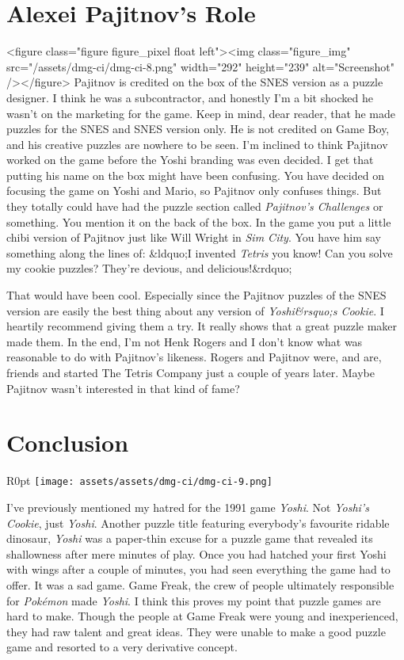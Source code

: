 \documentclass{book}
\begin{document}
\FloatBarrier\needspace{10mm}\section*{Alexei Pajitnov’s Role}\nopagebreak[4]

<figure class="figure figure_pixel float left"><img class="figure_img" src="/assets/dmg-ci/dmg-ci-8.png" width="292" height="239" alt="Screenshot" /></figure>
Pajitnov is credited on the box of the SNES version as a puzzle designer. I think he was a subcontractor, and honestly I’m a bit shocked he wasn’t on the marketing for the game. Keep in mind, dear reader, that he made puzzles for the SNES and SNES version only. He is not credited on Game Boy, and his creative puzzles are nowhere to be seen. I’m inclined to think Pajitnov worked on the game before the Yoshi branding was even decided. I get that putting his name on the box might have been confusing. You have decided on focusing the game on Yoshi and Mario, so Pajitnov only confuses things. But they totally could have had the puzzle section called \emph{Pajitnov’s Challenges} or something. You mention it on the back of the box. In the game you put a little chibi version of Pajitnov just like Will Wright in \emph{Sim City}. You have him say something along the lines of: &ldquo;I invented \emph{Tetris} you know! Can you solve my cookie puzzles? They’re devious, and delicious!&rdquo;

That would have been cool. Especially since the Pajitnov puzzles of the SNES version are easily the best thing about any version of \emph{Yoshi&rsquo;s Cookie}. I heartily recommend giving them a try. It really shows that a great puzzle maker made them. In the end, I’m not Henk Rogers and I don’t know what was reasonable to do with Pajitnov’s likeness. Rogers and Pajitnov were, and are, friends and started The Tetris Company just a couple of years later. Maybe Pajitnov wasn’t interested in that kind of fame?

\FloatBarrier\needspace{10mm}\section*{Conclusion}\nopagebreak[4]

\begin{wrapfigure}{R}{0pt} \texttt{[image: assets/assets/dmg-ci/dmg-ci-9.png]}\end{wrapfigure}
I’ve previously mentioned my hatred for the 1991 game \emph{Yoshi}. Not \emph{Yoshi’s Cookie}, just \emph{Yoshi}. Another puzzle title featuring everybody’s favourite ridable dinosaur, \emph{Yoshi} was a paper-thin excuse for a puzzle game that revealed its shallowness after mere minutes of play. Once you had hatched your first Yoshi with wings after a couple of minutes, you had seen everything the game had to offer. It was a sad game. Game Freak, the crew of people ultimately responsible for \emph{Pokémon} made \emph{Yoshi}. I think this proves my point that puzzle games are hard to make. Though the people at Game Freak were young and inexperienced, they had raw talent and great ideas. They were unable to make a good puzzle game and resorted to a very derivative concept.
\end{document}
